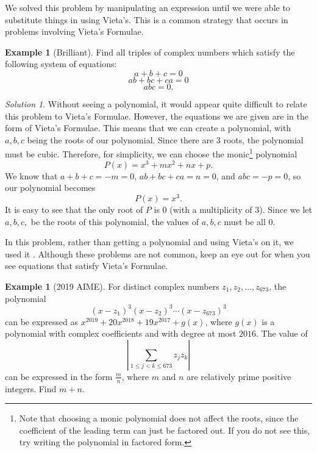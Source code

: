 \documentclass[l1pt]{article}
\theoremstyle{plain}
\theoremstyle{definition}
\newtheorem{example}[thm]{Example}
\theoremstyle{remark}
\newtheorem*{solution}{Solution}
\begin{document}
 We solved this problem by manipulating an expression until we were able to substitute things in using Vieta's. This is a common strategy that occurs in problems involving Vieta's Formulae.

 \begin{example}[Brilliant]
 Find all triples of complex numbers which satisfy the following system of equations:
 \[a+b+c=0\] \[ab+bc+ca=0\] \[abc=0.\]
 \end{example}

 \begin{solution}
 Without seeing a polynomial, it would appear quite difficult to relate this problem to Vieta's Formulae. However, the equations we are given are in the form of Vieta's Formulae. This means that we can create a polynomial, with $a, b, c$ being the roots of our polynomial. Since there are 3 roots, the polynomial must be cubic. Therefore, for simplicity, we can choose the monic\footnote{Note that choosing a monic polynomial does not affect the roots, since the coefficient of the leading term can just be factored out. If you do not see this, try writing the polynomial in factored form.} polynomial \[P(x)=x^3+mx^2+nx+p.\] We know that $a+b+c=-m=0$, $ab+bc+ca=n=0$, and $abc=-p=0$, so our polynomial becomes \[P(x)=x^3.\] It is easy to see that the only root of $P$ is 0 (with a multiplicity of 3). Since we let $a, b, c,$ be the roots of this polynomial, the values of $a, b, c$ must be all 0.
 \end{solution}

 In this problem, rather than getting a polynomial and using Vieta's on it, we used it . Although these problems are not common, keep an eye out for when you see equations that satisfy Vieta's Formulae.

\begin{example}[2019 AIME]
For distinct complex numbers $z_1,z_2,\dots,z_{673}$, the polynomial
\[ (x-z_1)^3(x-z_2)^3 \cdots (x-z_{673})^3 \]can be expressed as $x^{2019} + 20x^{2018} + 19x^{2017}+g(x)$, where $g(x)$ is a polynomial with complex coefficients and with degree at most $2016$. The value of
\[ \left| \sum_{1 \le j <k \le 673} z_jz_k \right| \]can be expressed in the form $\tfrac{m}{n}$, where $m$ and $n$ are relatively prime positive integers. Find $m+n$.
\end{example}
\end{document}
